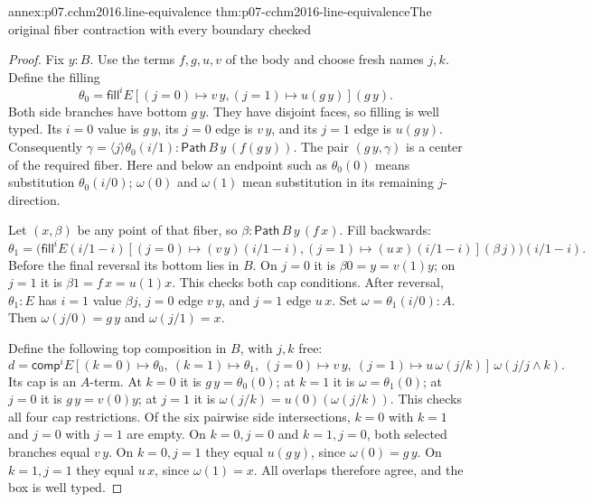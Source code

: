 \begin{annexitem}{annex:p07.cchm2016.line-equivalence}
 {thm:p07-cchm2016-line-equivalence}{The original fiber contraction with every boundary checked}
\begin{proof}
Fix \(y:B\).  Use the terms \(f,g,u,v\) of the body and choose fresh
names \(j,k\).  Define the filling
\[
 \theta_0=
 \mathsf{fill}^{i}E
 [(j=0)\mapsto v\,y,(j=1)\mapsto u(g\,y)](g\,y).
\]
Both side branches have bottom \(g\,y\).  They have disjoint faces,
so filling is well typed.  Its \(i=0\) value is \(g\,y\), its
\(j=0\) edge is \(v\,y\), and its \(j=1\) edge is \(u(g\,y)\).
Consequently
\(\gamma=\langle j\rangle\theta_0(i/1):
\mathsf{Path}\,B\,y\,(f(g\,y))\).
The pair \((g\,y,\gamma)\) is a center of the required fiber.
Here and below an endpoint such as \(\theta_0(0)\) means
substitution \(\theta_0(i/0)\); \(\omega(0)\) and \(\omega(1)\)
mean substitution in its remaining \(j\)-direction.

Let \((x,\beta)\) be any point of that fiber, so
\(\beta:\mathsf{Path}\,B\,y\,(f\,x)\).  Fill backwards:
\[
 \theta_1=
 \bigl(\mathsf{fill}^{i}E(i/1-i)
 [(j=0)\mapsto(v\,y)(i/1-i),
  (j=1)\mapsto(u\,x)(i/1-i)](\beta\,j)\bigr)(i/1-i).
\]
Before the final reversal its bottom lies in \(B\).
On \(j=0\) it is \(\beta0=y=v(1)y\); on \(j=1\) it is
\(\beta1=f\,x=u(1)x\).  This checks both cap conditions.
After reversal, \(\theta_1:E\) has \(i=1\) value \(\beta j\),
\(j=0\) edge \(v\,y\), and \(j=1\) edge \(u\,x\).
Set \(\omega=\theta_1(i/0):A\).  Then
\(\omega(j/0)=g\,y\) and \(\omega(j/1)=x\).

Define the following top composition in \(B\), with \(j,k\) free:
\[
 d=\mathsf{comp}^{i}E
 [(k=0)\mapsto\theta_0,\ (k=1)\mapsto\theta_1,\
  (j=0)\mapsto v\,y,\
  (j=1)\mapsto u\,\omega(j/k)]\,
       \omega(j/j\wedge k).
\]
Its cap is an \(A\)-term.  At \(k=0\) it is \(g\,y=\theta_0(0)\);
at \(k=1\) it is \(\omega=\theta_1(0)\);
at \(j=0\) it is \(g\,y=v(0)y\);
at \(j=1\) it is \(\omega(j/k)=u(0)(\omega(j/k))\).
This checks all four cap restrictions.
Of the six pairwise side intersections, \(k=0\) with \(k=1\)
and \(j=0\) with \(j=1\) are empty.  On \(k=0,j=0\) and \(k=1,j=0\),
both selected branches equal \(v\,y\).
On \(k=0,j=1\) they equal \(u(g\,y)\), since \(\omega(0)=g\,y\).
On \(k=1,j=1\) they equal \(u\,x\), since \(\omega(1)=x\).
All overlaps therefore agree, and the box is well typed.


\end{proof}
\end{annexitem}
